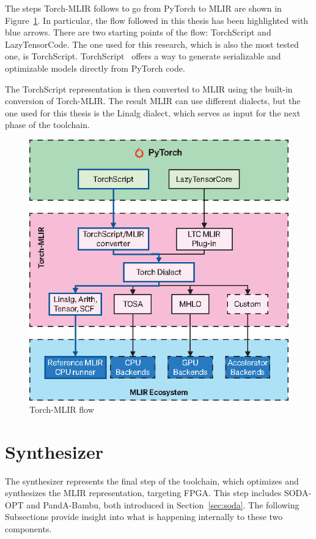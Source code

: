 The steps Torch-MLIR follows to go from PyTorch to MLIR are shown in Figure~\ref{fig:torch-mlir}.
In particular, the flow followed in this thesis has been highlighted with blue arrows.
There are two starting points of the flow: TorchScript and LazyTensorCode.
The one used for this research, which is also the most tested one, is TorchScript.
TorchScript~\cite{torchscript} offers a way to generate serializable and optimizable models directly from PyTorch code.

The TorchScript representation is then converted to MLIR using the built-in conversion of Torch-MLIR. The result MLIR can use different dialects, but the one used for this thesis is the Linalg dialect, which serves as input for the next phase of the toolchain.

\begin{figure}[t]
    \centering
    \includegraphics[height=0.5\textwidth]{Images/torch-mlir}
    \caption{Torch-MLIR flow}
    \label{fig:torch-mlir}
\end{figure}

\section{Synthesizer}
\label{sec:toolchain-synthesizer}%

The synthesizer represents the final step of the toolchain, which optimizes and synthesizes the MLIR representation, targeting FPGA\@.
This step includes SODA-OPT and PandA-Bambu, both introduced in Section~\ref{sec:soda}.
The following Subsections provide insight into what is happening internally to these two components.

